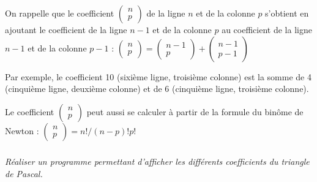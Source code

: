 \documentclass[10pt]{article}
\begin{document}
On rappelle que le coefficient $\begin{pmatrix} n \\ p \end{pmatrix}$ de la ligne $n$ et de la colonne $p$ s’obtient en ajoutant le coefficient de la ligne $n-1$ et de la colonne $p$ au coefficient de la ligne $n-1$ et de la colonne $p-1$ :
$\begin{pmatrix} n \\ p \end{pmatrix}
= \begin{pmatrix} n-1 \\ p \end{pmatrix} 
 + \begin{pmatrix} n-1 \\ p-1 \end{pmatrix} $

Par exemple, le coefficient 10 (sixième ligne, troisième colonne) est la somme de 4 (cinquième ligne, deuxième colonne) et de 6 (cinquième ligne, troisième colonne).

Le coefficient $\begin{pmatrix} n \\ p \end{pmatrix}$ peut aussi se calculer à partir de la formule du binôme de Newton : 
$\begin{pmatrix} n \\ p \end{pmatrix}=n!/(n-p)!p!$

\subparagraph*{}
\textit{Réaliser un programme permettant d’afficher les différents coefficients du triangle de Pascal.}
\end{document}
